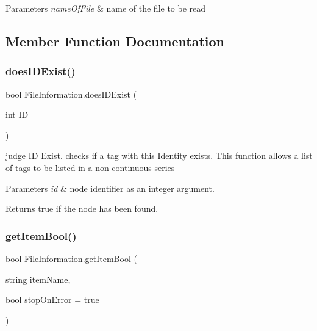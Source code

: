 \begin{DoxyParams}{Parameters}
{\em name\+Of\+File} & name of the file to be read \\
\hline
\end{DoxyParams}


\subsection{Member Function Documentation}
\mbox{\label{class_file_information_a4560ca8eebcef612a9e562f1cca644e8}} 
\subsubsection{\texorpdfstring{doesIDExist()}{doesIDExist()}}
{\footnotesize\ttfamily bool File\+Information.\+does\+I\+D\+Exist (\begin{DoxyParamCaption}\item[{int}]{ID }\end{DoxyParamCaption})\hspace{0.3cm}{\ttfamily [inline]}}



judge ID Exist. checks if a tag with this Identity exists. This function allows a list of tags to be listed in a non-\/continuous series 


\begin{DoxyParams}{Parameters}
{\em id} & node identifier as an integer argument. \\
\hline
\end{DoxyParams}
\begin{DoxyReturn}{Returns}
true if the node has been found. 
\end{DoxyReturn}
\mbox{\label{class_file_information_a1e9c6e7a91a72a839f3bb5d0430b1cfa}} 
\subsubsection{\texorpdfstring{getItemBool()}{getItemBool()}\hspace{0.1cm}{\footnotesize\ttfamily [1/2]}}
{\footnotesize\ttfamily bool File\+Information.\+get\+Item\+Bool (\begin{DoxyParamCaption}\item[{string}]{item\+Name,  }\item[{bool}]{stop\+On\+Error = {\ttfamily true} }\end{DoxyParamCaption})\hspace{0.3cm}{\ttfamily [inline]}}



